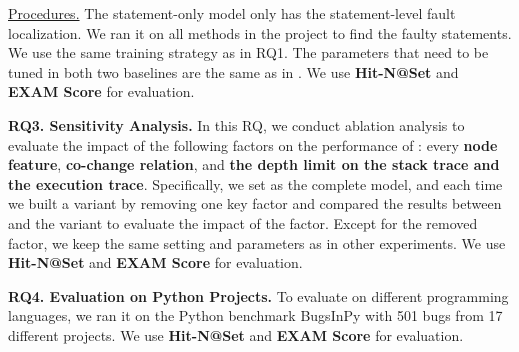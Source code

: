 
\underline{Procedures.}
The statement-only model only has the statement-level fault
localization. We ran it on all methods in the project to find the
faulty statements. We use the same training strategy as in RQ1.  The
parameters that need to be tuned in both two baselines are the same as
in {\tool}. We use \textbf{Hit-N@Set} and \textbf{EXAM Score} for
evaluation.

{\bf RQ3. Sensitivity Analysis.}  In this RQ, we conduct ablation
analysis to evaluate the impact of the following factors on the
performance of {\tool}: every {\bf node feature}, {\bf co-change
relation}, and {\bf the depth limit on the stack trace and the
execution trace}. Specifically, we set \tool as the complete model,
and each time we built a variant by removing one key factor and
compared the results between {\tool} and the variant to evaluate
the impact of the factor. Except for the removed factor, we keep the
same setting and parameters as in other experiments. We
use \textbf{Hit-N@Set} and \textbf{EXAM Score} for evaluation.

{\bf RQ4. Evaluation on Python Projects.}
%
To evaluate {\tool} on different programming languages, we ran it on the Python benchmark BugsInPy \cite{BugsInPy,widyasari2020bugsinpy} with 501 bugs from 17 different projects. We use \textbf{Hit-N@Set} and \textbf{EXAM Score} for evaluation.
